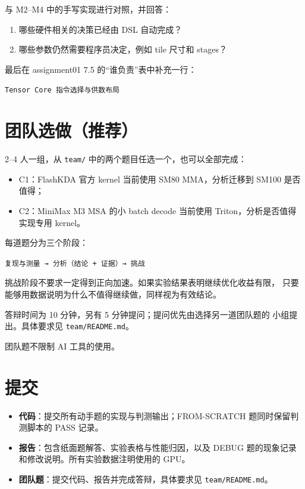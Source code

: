 \documentclass[11pt,a4paper,fontset=none]{ctexart}
\providecommand{\tightlist}{\setlength{\itemsep}{0pt}\setlength{\parskip}{0pt}}
\providecommand{\passthrough}[1]{#1}
\begin{document}
与 M2--M4 中的手写实现进行对照，并回答：

\begin{enumerate}
\def\labelenumi{(\alph{enumi})}
\item
  哪些硬件相关的决策已经由 DSL 自动完成？
\item
  哪些参数仍然需要程序员决定，例如 tile 尺寸和 stages？
\end{enumerate}

最后在 assignment01 7.5 的``谁负责''表中补充一行：

\passthrough{\lstinline!Tensor Core 指令选择与供数布局!}

\hypertarget{ux56e2ux961fux9009ux505aux63a8ux8350}{%
\section*{团队选做（推荐）}\label{ux56e2ux961fux9009ux505aux63a8ux8350}}

2--4 人一组，从 \passthrough{\lstinline!team/!}
中的两个题目任选一个，也可以全部完成：

\begin{itemize}
\tightlist
\item
  C1：FlashKDA 官方 kernel 当前使用 SM80 MMA，分析迁移到 SM100
  是否值得；
\item
  C2：MiniMax M3 MSA 的小 batch decode 当前使用
  Triton，分析是否值得实现专用 kernel。
\end{itemize}

每道题分为三个阶段：

\passthrough{\lstinline!复现与测量 → 分析（结论 + 证据）→ 挑战!}

挑战阶段不要求一定得到正向加速。如果实验结果表明继续优化收益有限，
只要能够用数据说明为什么不值得继续做，同样视为有效结论。

答辩时间为 10 分钟，另有 5 分钟提问；提问优先由选择另一道团队题的
小组提出。具体要求见 \passthrough{\lstinline!team/README.md!}。

团队题不限制 AI 工具的使用。

\hypertarget{ux63d0ux4ea4}{%
\section*{提交}\label{ux63d0ux4ea4}}

\begin{itemize}
\tightlist
\item
  \textbf{代码}：提交所有动手题的实现与判测输出；FROM-SCRATCH
  题同时保留判测脚本的 PASS 记录。
\item
  \textbf{报告}：包含纸面题解答、实验表格与性能归因，以及 DEBUG
  题的现象记录和修改说明。所有实验数据注明使用的 GPU。
\item
  \textbf{团队题}：提交代码、报告并完成答辩，具体要求见
  \passthrough{\lstinline!team/README.md!}。
\end{itemize}
\end{document}
